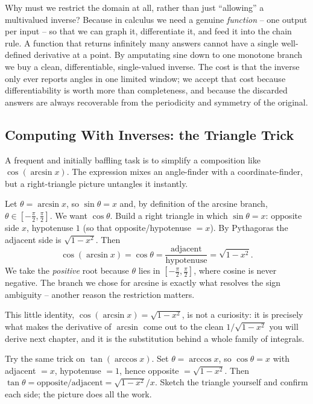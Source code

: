 \begin{whybox}
Why must we restrict the domain at all, rather than just ``allowing'' a multivalued inverse? Because in calculus we need a genuine \emph{function} -- one output per input -- so that we can graph it, differentiate it, and feed it into the chain rule. A function that returns infinitely many answers cannot have a single well-defined derivative at a point. By amputating sine down to one monotone branch we buy a clean, differentiable, single-valued inverse. The cost is that the inverse only ever reports angles in one limited window; we accept that cost because differentiability is worth more than completeness, and because the discarded answers are always recoverable from the periodicity and symmetry of the original.
\end{whybox}

\subsection{Computing With Inverses: the Triangle Trick}

A frequent and initially baffling task is to simplify a composition like $\cos(\arcsin x)$. The expression mixes an angle-finder with a coordinate-finder, but a right-triangle picture untangles it instantly.

\begin{example}
\label{ch04:ex-triangle}
Let $\theta = \arcsin x$, so $\sin\theta = x$ and, by definition of the arcsine branch, $\theta\in[-\tfrac\pi2,\tfrac\pi2]$. We want $\cos\theta$. Build a right triangle in which $\sin\theta = x$: opposite side $x$, hypotenuse $1$ (so that opposite/hypotenuse $= x$). By Pythagoras the adjacent side is $\sqrt{1 - x^2}$. Then
\[
  \cos(\arcsin x) = \cos\theta = \frac{\text{adjacent}}{\text{hypotenuse}} = \sqrt{1 - x^2}.
\]
We take the \emph{positive} root because $\theta$ lies in $[-\tfrac\pi2,\tfrac\pi2]$, where cosine is never negative. The branch we chose for arcsine is exactly what resolves the sign ambiguity -- another reason the restriction matters.
\end{example}

This little identity, $\cos(\arcsin x) = \sqrt{1-x^2}$, is not a curiosity: it is precisely what makes the derivative of $\arcsin$ come out to the clean $1/\sqrt{1-x^2}$ you will derive next chapter, and it is the substitution behind a whole family of integrals.

\begin{labbox}
Try the same trick on $\tan(\arccos x)$. Set $\theta=\arccos x$, so $\cos\theta = x$ with adjacent $=x$, hypotenuse $=1$, hence opposite $=\sqrt{1-x^2}$. Then $\tan\theta = \text{opposite}/\text{adjacent} = \sqrt{1-x^2}/x$. Sketch the triangle yourself and confirm each side; the picture does all the work.
\end{labbox}

